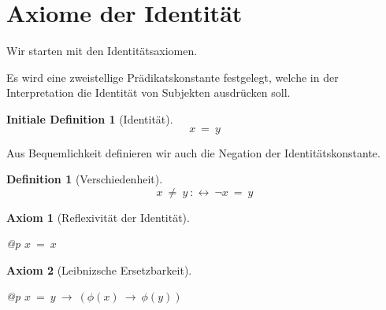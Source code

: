 \documentclass[a4paper,german,10pt,twoside]{book}
\newtheorem{ax}{Axiom}
\theoremstyle{definition}
\newtheorem{defn}[thm]{Definition}
\newtheorem{idefn}[thm]{Initiale Definition}
\theoremstyle{remark}
\begin{document}
\section{Axiome der Identit{\"a}t} \label{chapter6_section0} \hypertarget{chapter6_section0}{}
Wir starten mit den Identit{\"a}tsaxiomen.

\par
Es wird eine zweistellige Pr{\"a}dikatskonstante festgelegt, welche in der Interpretation die Identit{\"a}t von Subjekten ausdr{\"u}cken soll.

\begin{idefn}[Identit{\"a}t]
\label{definition:identity} \hypertarget{definition:identity}{}
$$x \ =  \ y$$

\end{idefn}




\par
Aus Bequemlichkeit definieren wir auch die Negation der Identit{\"a}tskonstante.

\begin{defn}[Verschiedenheit]
\label{definition:notEqual} \hypertarget{definition:notEqual}{}
$$x \ \neq \ y\ :\leftrightarrow \ \neg x \ =  \ y$$

\end{defn}




\par


\begin{ax}[Reflexivit{\"a}t der Identit{\"a}t]
\label{axiom:identityIsReflexive} \hypertarget{axiom:identityIsReflexive}{}
\mbox{}
\begin{longtable}{{@{\extracolsep{\fill}}p{\linewidth}}}
\centering $x \ =  \ x$
\end{longtable}

\end{ax}




\par


\begin{ax}[Leibnizsche Ersetzbarkeit]
\label{axiom:leibnizReplacement} \hypertarget{axiom:leibnizReplacement}{}
\mbox{}
\begin{longtable}{{@{\extracolsep{\fill}}p{\linewidth}}}
\centering $x \ =  \ y\ \rightarrow \ (\phi(x)\ \rightarrow \ \phi(y))$
\end{longtable}

\end{ax}
\end{document}
